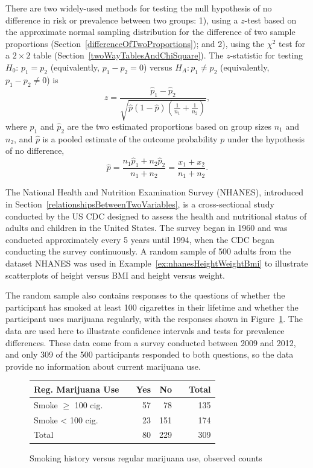 There are two widely-used methods for testing the null hypothesis of no difference in risk or prevalence between two groups: 1), using a $z$-test based on the approximate normal sampling distribution for the difference of two sample proportions (Section~\ref{differenceOfTwoProportions}); and 2), using the $\chi^2$ test for a $2 \times 2$ table (Section~\ref{twoWayTablesAndChiSquare}).   The $z$-statistic for testing $H_0:\, p_1 = p_2$ (equivalently, $p_1 - p_2 = 0$) versus $H_A: p_1 \neq p_2$ (equivalently, $p_1 - p_2 \neq 0$) is
\[z = \dfrac{\hat{p}_1 - \hat{p}_2}{\sqrt{\hat{p}(1-\hat{p})\left(\frac{1}{n_1} + \frac{1}{n_2} \right)}}, \]
where $\hat{p}_1$ and $\hat{p}_2$ are the two estimated proportions based on group sizes $n_1$ and $n_2$, and $\hat{p}$ is a pooled estimate of the outcome probability $p$ under the hypothesis of no difference,
\[\hat{p} = \dfrac{n_{1}\hat{p}_1 + n_{2}\hat{p}_2}{n_{1} + n_{2}} = \dfrac{x_{1} + x_{2}}{n_{1} + n_{2}}. \]

The National Health and Nutrition Examination Survey (NHANES), introduced in Section~\ref{relationshipsBetweenTwoVariables}, is a cross-sectional study conducted by the US CDC designed to assess the health and nutritional status of adults and children in the United States.  The survey began in 1960 and was conducted approximately every 5 years until 1994, when the CDC began conducting the survey continuously. A random sample of 500 adults from the dataset NHANES was used in Example~\ref{ex:nhanesHeightWeightBmi} to illustrate scatterplots of height versus BMI and height versus weight.

The random sample also contains responses to the questions of whether the participant has smoked at least 100 cigarettes in their lifetime and whether the participant uses marijuana regularly, with the responses shown in Figure~\ref{figure:smoke100RegMarijuana}.  The data are used here to illustrate confidence intervals and tests for prevalence differences.  These data come from a survey conducted between 2009 and 2012, and only 309 of the 500 participants responded to both questions, so the data provide no information about current marijuana use.

\begin{figure}[h]
  \centering
  \begin{tabular}{ll rrr r}
    \hline
    Reg. Marijuana Use  & \hspace{2mm} & Yes & No & \hspace{2mm} & Total \\
    \hline
    Smoke $\geq$ 100 cig. & & 57 & 78 &  & 135  \\
    Smoke < 100 cig. & & 23 & 151 &  &  174  \\
        Total & & 80 & 229 & & 309 \\
    \hline
  \end{tabular}
    \caption{Smoking history versus regular marijuana use, observed counts}
    \label{figure:smoke100RegMarijuana}
\end{figure}

